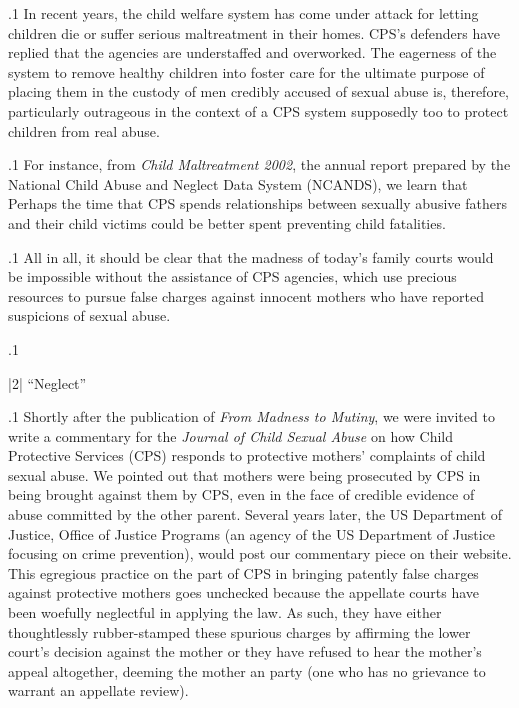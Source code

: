 \documentclass[11pt, twoside]{article}
\begin{document}
{\p.1{%
In recent years, the child welfare system has come under attack for
letting children die or suffer serious maltreatment in their homes. CPS's
defenders have replied that the agencies are understaffed and overworked. The eagerness of the system to remove healthy children into
foster care for the ultimate purpose of placing them in the custody of
men credibly accused of sexual abuse is, therefore, particularly outrageous in the context of a CPS system supposedly too  to
protect children from real abuse.
}%

\p.1{%
For instance, from \textit{Child Maltreatment 2002}, the annual report
prepared by the National Child Abuse and Neglect Data System
(NCANDS), we learn that  Perhaps the time that CPS
spends  relationships between sexually abusive fathers and their child victims could be better spent preventing child
fatalities.
}%

\p.1{%
All in all, it should be clear that the madness of today's family courts
would be impossible without the assistance of CPS agencies, which use
precious resources to pursue false charges against innocent mothers who
have reported suspicions of sexual abuse.
}%

\p.1{%
\writeAddendum{}
}%


\s|2|{ ``Neglect''}

\p.1{%
\noindent{}Shortly after the publication of \textit{From Madness to Mutiny}, we were invited to write a commentary for the \textit{Journal of Child Sexual Abuse} on
how Child Protective Services (CPS) responds
to protective mothers' complaints of child sexual
abuse. We pointed out that mothers were being prosecuted by CPS in
 being brought against them by CPS, even in the face of credible evidence
of abuse committed by the other parent. Several years later, the US
Department of Justice, Office of Justice Programs (an agency of the US
Department of Justice focusing on crime prevention), would post our
commentary piece on their website. This egregious practice on the part
of CPS in bringing patently false charges against protective mothers goes
unchecked because the appellate courts have been woefully neglectful
in applying the law. As such, they have either thoughtlessly
rubber-stamped these spurious charges by affirming the lower court's decision
against the mother or they have refused to hear the mother's appeal altogether, deeming the mother an  party (one who has no
grievance to warrant an appellate review).
}%

}
\end{document}
